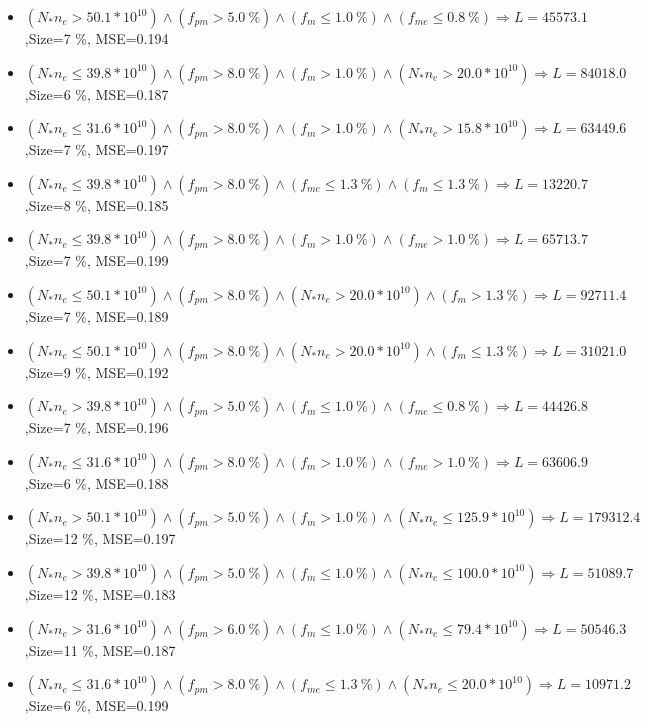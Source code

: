 \documentclass[numbered]{CSL}
\begin{document}
\begin{itemize}
\item $(N_* n_e > 50.1 * 10^{10}) \land (f_{pm} > 5.0~\%) \land (f_m \leq 1.0~\%) \land (f_{me} \leq 0.8~\%) \Rightarrow L = 45573.1$,\hfill Size=7 \%, MSE=0.194
\item $(N_* n_e \leq 39.8 * 10^{10}) \land (f_{pm} > 8.0~\%) \land (f_m > 1.0~\%) \land (N_* n_e > 20.0 * 10^{10}) \Rightarrow L = 84018.0$,\hfill Size=6 \%, MSE=0.187
\item $(N_* n_e \leq 31.6 * 10^{10}) \land (f_{pm} > 8.0~\%) \land (f_m > 1.0~\%) \land (N_* n_e > 15.8 * 10^{10}) \Rightarrow L = 63449.6$,\hfill Size=7 \%, MSE=0.197
\item $(N_* n_e \leq 39.8 * 10^{10}) \land (f_{pm} > 8.0~\%) \land (f_{me} \leq 1.3~\%) \land (f_m \leq 1.3~\%) \Rightarrow L = 13220.7$,\hfill Size=8 \%, MSE=0.185
\item $(N_* n_e \leq 39.8 * 10^{10}) \land (f_{pm} > 8.0~\%) \land (f_m > 1.0~\%) \land (f_{me} > 1.0~\%) \Rightarrow L = 65713.7$,\hfill Size=7 \%, MSE=0.199
\item $(N_* n_e \leq 50.1 * 10^{10}) \land (f_{pm} > 8.0~\%) \land (N_* n_e > 20.0 * 10^{10}) \land (f_m > 1.3~\%) \Rightarrow L = 92711.4$,\hfill Size=7 \%, MSE=0.189
\item $(N_* n_e \leq 50.1 * 10^{10}) \land (f_{pm} > 8.0~\%) \land (N_* n_e > 20.0 * 10^{10}) \land (f_m \leq 1.3~\%) \Rightarrow L = 31021.0$,\hfill Size=9 \%, MSE=0.192
\item $(N_* n_e > 39.8 * 10^{10}) \land (f_{pm} > 5.0~\%) \land (f_m \leq 1.0~\%) \land (f_{me} \leq 0.8~\%) \Rightarrow L = 44426.8$,\hfill Size=7 \%, MSE=0.196
\item $(N_* n_e \leq 31.6 * 10^{10}) \land (f_{pm} > 8.0~\%) \land (f_m > 1.0~\%) \land (f_{me} > 1.0~\%) \Rightarrow L = 63606.9$,\hfill Size=6 \%, MSE=0.188
\item $(N_* n_e > 50.1 * 10^{10}) \land (f_{pm} > 5.0~\%) \land (f_m > 1.0~\%) \land (N_* n_e \leq 125.9 * 10^{10}) \Rightarrow L = 179312.4$,\hfill Size=12 \%, MSE=0.197
\item $(N_* n_e > 39.8 * 10^{10}) \land (f_{pm} > 5.0~\%) \land (f_m \leq 1.0~\%) \land (N_* n_e \leq 100.0 * 10^{10}) \Rightarrow L = 51089.7$,\hfill Size=12 \%, MSE=0.183
\item $(N_* n_e > 31.6 * 10^{10}) \land (f_{pm} > 6.0~\%) \land (f_m \leq 1.0~\%) \land (N_* n_e \leq 79.4 * 10^{10}) \Rightarrow L = 50546.3$,\hfill Size=11 \%, MSE=0.187
\item $(N_* n_e \leq 31.6 * 10^{10}) \land (f_{pm} > 8.0~\%) \land (f_{me} \leq 1.3~\%) \land (N_* n_e \leq 20.0 * 10^{10}) \Rightarrow L = 10971.2$,\hfill Size=6 \%, MSE=0.199

\end{itemize}
\end{document}
